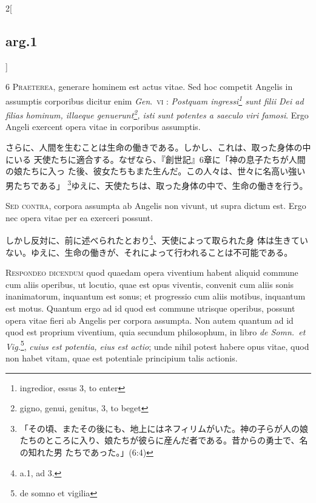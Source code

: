 \documentclass[paper=a4paper,fontsize=10pt,jafontsize=9pt,titlepage]{jlreq}
\begin{document}
\begin{paracol}{2}[\subsection{arg.1}]

{\scshape 6 Praeterea}, generare hominem est actus vitae. Sed hoc competit
Angelis in assumptis corporibus dicitur enim {\itshape Gen}.~{\scshape vi} :
{\itshape Postquam ingressi\footnote{ingredior, essus 3, to enter} sunt filii
Dei ad filias hominum, illaeque genuerunt\footnote{gigno, genui, genitus, 3, to
beget}, isti sunt potentes a saeculo viri famosi}. Ergo Angeli exercent opera
vitae in corporibus assumptis.

\switchcolumn

さらに、人間を生むことは生命の働きである。しかし、これは、取った身体の中にいる
 天使たちに適合する。なぜなら、『創世記』6章に「神の息子たちが人間の娘たちに入っ
 た後、彼女たちもまた生んだ。この人々は、世々に名高い強い男たちである」
 \footnote{「その頃、またその後にも、地上にはネフィリムがいた。神の子らが人の娘
 たちのところに入り、娘たちが彼らに産んだ者である。昔からの勇士で、名の知れた男
 たちであった。」(6:4)}ゆえに、天使たちは、取った身体の中で、生命の働きを行う。

\switchcolumn*[\subsection{s.c.}]

{\scshape Sed contra}, corpora assumpta ab Angelis non
vivunt, ut supra dictum est. Ergo nec opera vitae per ea exerceri
possunt.

\switchcolumn

しかし反対に、前に述べられたとおり\footnote{a.1, ad 3.}、天使によって取られた身
 体は生きていない。ゆえに、生命の働きが、それによって行われることは不可能である。


{\scshape Respondeo dicendum} quod quaedam opera viventium habent aliquid
commune cum aliis operibus, ut locutio, quae est opus viventis, convenit cum
aliis sonis inanimatorum, inquantum est sonus; et progressio cum aliis motibus,
inquantum est motus. Quantum ergo ad id quod est commune utrisque operibus,
possunt opera vitae fieri ab Angelis per corpora assumpta. Non autem quantum ad
id quod est proprium viventium, quia secundum philosophum, in libro {\itshape de
Somn.~et Vig.}\footnote{de somno et vigilia}, {\itshape cuius est potentia, eius
est actio}; unde nihil potest habere opus vitae, quod non habet vitam, quae est
potentiale principium talis actionis.


\end{paracol}
\end{document}
